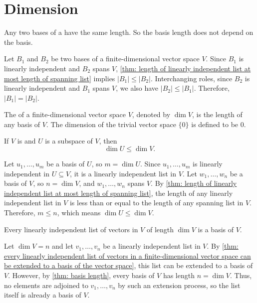 \section{Dimension}

\setcounter{thm}{33}
\begin{thm}  Any two bases of a \fdvs have the same length. So the basis length does not depend on the basis.
  \label{thm: basis length}
\end{thm}
\begin{prf}
  Let $B_1$ and $B_2$ be two bases of a finite-dimensional vector space $V$.
  Since $B_1$ is linearly independent and $B_2$ spans $V$, \ref{thm: length of linearly independent list at most length of spanning list} implies $|B_1| \leq |B_2|$.
  Interchanging roles, since $B_2$ is linearly independent and $B_1$ spans $V$, we also have $|B_2| \leq |B_1|$.
  Therefore, $|B_1| = |B_2|$.
\end{prf}

\begin{mydef} 
  The  of a finite-dimensional vector space $V$, denoted by $\dim V$, is the length of any basis of $V$.
  The dimension of the trivial vector space $\{0\}$ is defined to be $0$.
\end{mydef}

\setcounter{thm}{36}
\begin{thm} 
  \label{thm: dimension of a subspace}
  If $V$ is \fd and $U$ is a subspace of $V$, then
  \begin{equation}
    \dim U \leq \dim V.
  \end{equation}
\end{thm}
\begin{prf}
  Let $u_1, \dots, u_m$ be a basis of $U$, so $m = \dim U$. Since $u_1, \dots, u_m$ is linearly independent in $U \subseteq V$, it is a linearly independent list in $V$.
  Let $w_1, \dots, w_n$ be a basis of $V$, so $n = \dim V$, and $w_1, \dots, w_n$ spans $V$.
  By \ref{thm: length of linearly independent list at most length of spanning list}, the length of any linearly independent list in $V$ is less than or equal to the length of any spanning list in $V$. Therefore, $m \leq n$, which means $\dim U \leq \dim V$.
\end{prf}

\begin{thm} 
  \label{thm: linearly independent list of the right length is a basis}
  Every linearly independent list of vectors in $V$ of length $\dim V$ is a basis of $V$.
\end{thm}
\begin{prf}
  Let $\dim V = n$ and let $v_1, \ldots, v_n$ be a linearly independent list in $V$.
  By \ref{thm: every linearly independent list of vectors in a finite-dimensional vector space can be extended to a basis of the vector space}, this list can be extended to a basis of $V$.
  However, by \ref{thm: basis length}, every basis of $V$ has length $n = \dim V$.
  Thus, no elements are adjoined to $v_1, \ldots, v_n$ by such an extension process, so the list itself is already a basis of $V$.
\end{prf}


